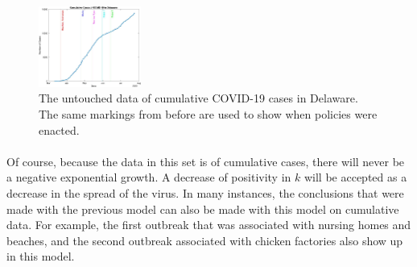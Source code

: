 \documentclass[12pt]{article}
\begin{document}
\begin{figure}[h]
  \centering
  \subfigure
    \includegraphics[width=0.3\textwidth]{Figure11.jpg}%
  \caption{The untouched data of cumulative COVID-19 cases in Delaware. The same markings from before are used to show when policies were enacted.}
  \label{fig:10}
\end{figure}

\paragraph{} Of course, because the data in this set is of cumulative cases, there will never be a negative exponential growth. A decrease of positivity in $k$ will be accepted as a decrease in the spread of the virus. In many instances, the conclusions that were made with the previous model can also be made with this model on cumulative data. For example, the first outbreak that was associated with nursing homes and beaches, and the second outbreak associated with chicken factories also show up in this model.
\end{document}

